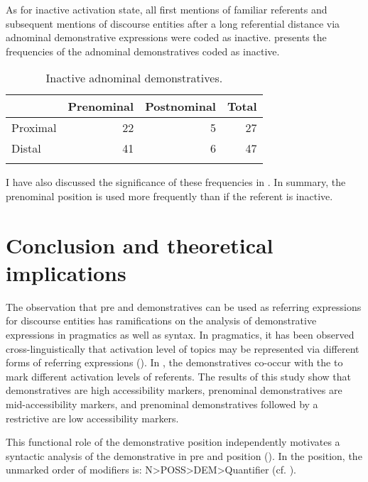 \documentclass[output=paper,
modfonts
]{langscibook}
\begin{document}
As for inactive activation state, all first mentions of familiar referents and subsequent mentions of discourse entities after a long referential distance via adnominal demonstrative expressions were coded as inactive.  presents the frequencies of the adnominal demonstratives coded as inactive.

\begin{table}
\begin{tabularx}{.66\textwidth}{Xrrr}
\lsptoprule
& {\bfseries Prenominal} & {\bfseries Postnominal} & {\bfseries Total}\\
\midrule
{ Proximal} & 22 & 5 & 27\\
{ Distal} & 41 & 6 & 47\\
\lspbottomrule
\end{tabularx}

\caption{Inactive adnominal demonstratives.}
\label{tab:mwamzandi:9}
\end{table}

I have also discussed the significance of these frequencies in . In summary, the prenominal position is used more frequently than  if the referent is inactive.

\section{Conclusion and theoretical implications}\label{sec:mwamzandi:4}

The observation that pre and  demonstratives can be used as referring expressions for discourse entities has ramifications on the analysis of  demonstrative expressions in pragmatics as well as syntax. In pragmatics, it has been observed cross-linguistically that activation level of topics may be represented via different forms of referring expressions (\citealt{GundelEtAl1993,Ariel1988,Ariel1991,Ariel2001}). In , the demonstratives co-occur with the  to mark different activation levels of referents. The results of this study show that  demonstratives are high accessibility markers, prenominal demonstratives are mid-accessibility markers, and prenominal demonstratives followed by a restrictive  are low accessibility markers.

This functional role of the demonstrative position independently motivates a syntactic analysis of the  demonstrative in pre and  position (\citealt{Carstens1991,Carstens2008}). In the  position, the unmarked order of   modifiers is: N>POSS>DEM>Quantifier  (cf. \citealt{Rugemalira2007}).
\end{document}
